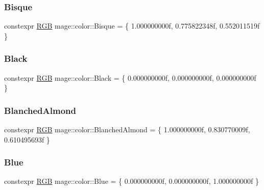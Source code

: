\subsubsection{\texorpdfstring{Bisque}{Bisque}}
{\footnotesize\ttfamily constexpr \hyperlink{structmage_1_1_r_g_b}{R\+GB} mage\+::color\+::\+Bisque = \{ 1.\+000000000f, 0.\+775822348f, 0.\+552011519f \}}

\hypertarget{namespacemage_1_1color_a1395fb0c23b604e389b2d81fd0670bdc}{}\label{namespacemage_1_1color_a1395fb0c23b604e389b2d81fd0670bdc} 
\subsubsection{\texorpdfstring{Black}{Black}}
{\footnotesize\ttfamily constexpr \hyperlink{structmage_1_1_r_g_b}{R\+GB} mage\+::color\+::\+Black = \{ 0.\+000000000f, 0.\+000000000f, 0.\+000000000f \}}

\hypertarget{namespacemage_1_1color_a1ffaefe9ca0592fa48fa321b694fd489}{}\label{namespacemage_1_1color_a1ffaefe9ca0592fa48fa321b694fd489} 
\subsubsection{\texorpdfstring{Blanched\+Almond}{BlanchedAlmond}}
{\footnotesize\ttfamily constexpr \hyperlink{structmage_1_1_r_g_b}{R\+GB} mage\+::color\+::\+Blanched\+Almond = \{ 1.\+000000000f, 0.\+830770009f, 0.\+610495693f \}}

\hypertarget{namespacemage_1_1color_af2a2acff5b9725eb57bef7dc4822892b}{}\label{namespacemage_1_1color_af2a2acff5b9725eb57bef7dc4822892b} 
\subsubsection{\texorpdfstring{Blue}{Blue}}
{\footnotesize\ttfamily constexpr \hyperlink{structmage_1_1_r_g_b}{R\+GB} mage\+::color\+::\+Blue = \{ 0.\+000000000f, 0.\+000000000f, 1.\+000000000f \}}

\hypertarget{namespacemage_1_1color_a456981fe1885b8347622a2b63fc27fe0}{}\label{namespacemage_1_1color_a456981fe1885b8347622a2b63fc27fe0} 
